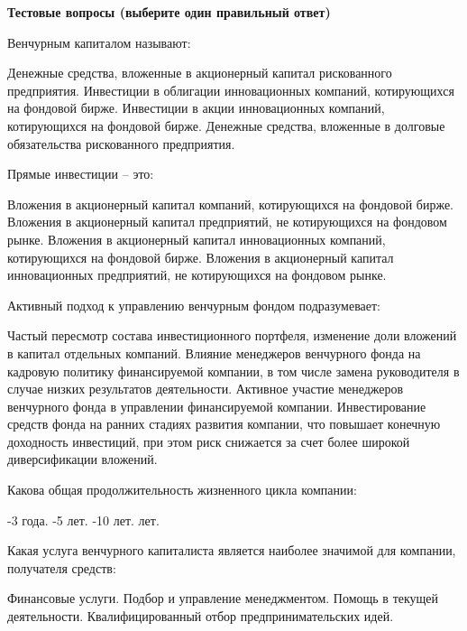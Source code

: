 \documentclass[12pt, table]{exam}
\begin{document}
\pagebreak
\noindent\textbf{Тестовые вопросы (выберите один правильный ответ)}

\begin{questions}
\begin{multicols}{2}
\setlength{\columnsep}{1cm}
\question Венчурным капиталом называют:
\begin{choices}
	\CC Денежные средства, вложенные в акционерный капитал рискованного предприятия.
	\choice Инвестиции в облигации инновационных компаний, котирующихся на фондовой бирже.
	\choice Инвестиции в акции инновационных компаний, котирующихся на фондовой бирже.
	\choice Денежные средства, вложенные в долговые обязательства рискованного предприятия.
\end{choices}

\question Прямые инвестиции – это:
\begin{choices}
	\choice Вложения в акционерный капитал компаний, котирующихся на фондовой бирже.
	\CC Вложения в акционерный капитал предприятий, не котирующихся на фондовом рынке.
	\choice Вложения в акционерный капитал инновационных компаний, котирующихся на фондовой бирже.
	\choice Вложения в акционерный капитал инновационных предприятий, не котирующихся на фондовом рынке.
\end{choices}

\question Активный подход к управлению венчурным фондом подразумевает:
\begin{choices}
	\choice Частый пересмотр состава инвестиционного портфеля, изменение доли вложений в капитал отдельных компаний.
	\choice Влияние менеджеров венчурного фонда на кадровую политику финансируемой компании, в том числе замена руководителя в случае низких результатов деятельности.
	\CC Активное участие менеджеров венчурного фонда в управлении финансируемой компании.
	\choice Инвестирование средств фонда на ранних стадиях развития компании, что повышает конечную доходность инвестиций, при этом риск снижается за счет более широкой диверсификации вложений.
\end{choices}

\question Какова общая продолжительность жизненного цикла компании:
\begin{choices}
	-3 года.
	-5 лет.
	-10 лет.
	 лет.
\end{choices}

\question Какая услуга венчурного капиталиста является наиболее значимой для компании, получателя средств:
\begin{choices}
	\choice Финансовые услуги.
	\choice Подбор и управление менеджментом.
	\choice Помощь в текущей деятельности.
	\CC Квалифицированный отбор предпринимательских идей.
\end{choices}


\end{multicols}
\end{questions}
\end{document}

